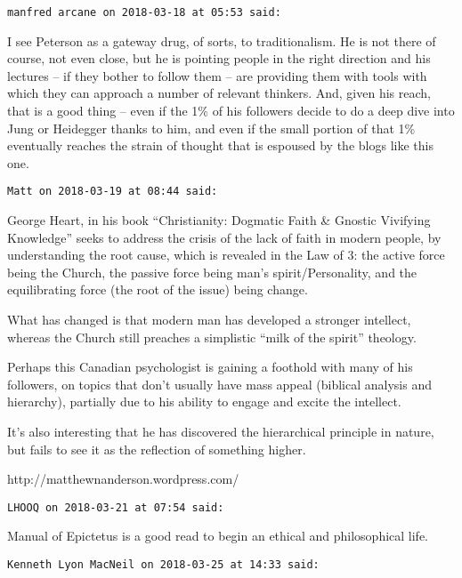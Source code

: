 \begin{footnotesize}\begin{sffamily}



\texttt{manfred arcane on 2018-03-18 at 05:53 said: }

I see Peterson as a gateway drug, of sorts, to traditionalism. He is not there of course, not even close, but he is pointing people in the right direction and his lectures – if they bother to follow them – are providing them with tools with which they can approach a number of relevant thinkers. And, given his reach, that is a good thing – even if the 1\% of his followers decide to do a deep dive into Jung or Heidegger thanks to him, and even if the small portion of that 1\% eventually reaches the strain of thought that is espoused by the blogs like this one.


\hfill


\hfill

\texttt{Matt on 2018-03-19 at 08:44 said: }

George Heart, in his book “Christianity: Dogmatic Faith \& Gnostic Vivifying Knowledge” seeks to address the crisis of the lack of faith in modern people, by understanding the root cause, which is revealed in the Law of 3: the active force being the Church, the passive force being man's spirit/Personality, and the equilibrating force (the root of the issue) being change.

What has changed is that modern man has developed a stronger intellect, whereas the Church still preaches a simplistic “milk of the spirit” theology.

Perhaps this Canadian psychologist is gaining a foothold with many of his followers, on topics that don't usually have mass appeal (biblical analysis and hierarchy), partially due to his ability to engage and excite the intellect.

It's also interesting that he has discovered the hierarchical principle in nature, but fails to see it as the reflection of something higher.

http://matthewnanderson.wordpress.com/


\hfill

\texttt{LHOOQ on 2018-03-21 at 07:54 said: }

Manual of Epictetus is a good read to begin an ethical and philosophical life.


\hfill

\texttt{Kenneth Lyon MacNeil on 2018-03-25 at 14:33 said: }


\end{sffamily}
\end{footnotesize}
